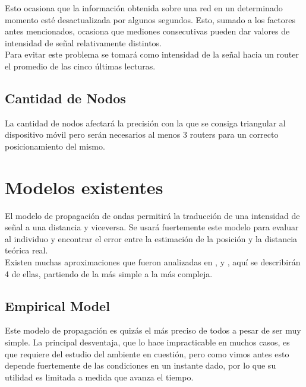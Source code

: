 \documentclass[journal]{IEEEtran}
\begin{document}
Esto ocasiona que la información obtenida sobre una red en un determinado momento esté desactualizada por algunos segundos. Esto, sumado a los factores antes mencionados, ocasiona que mediones consecutivas pueden dar valores de intensidad de señal relativamente distintos.\\

Para evitar este problema se tomará como intensidad de la señal hacia un router el promedio de las cinco últimas lecturas.\\

\subsection{Cantidad de Nodos}

La cantidad de nodos afectará la precisión con la que se consiga triangular al dispositivo móvil pero serán necesarios al menos 3 routers para un correcto posicionamiento del mismo.\\

\section{Modelos existentes}

El modelo de propagación de ondas permitirá la traducción de una intensidad de señal a una distancia y viceversa. Se usará fuertemente este modelo para evaluar al individuo y encontrar el error entre la estimación de la posición y la distancia teórica real.\\

Existen muchas aproximaciones que fueron analizadas en \cite{low:cost:location:determination}, \cite{radar:tracking:system} y \cite{generic:model:signal:propagation}, aquí se describirán 4 de ellas, partiendo de la más simple a la más compleja.\\

\subsection{Empirical Model}

Este modelo de propagación es quizás el más preciso de todos a pesar de ser muy simple. La principal desventaja, que lo hace impracticable en muchos casos, es que requiere del estudio del ambiente en cuestión, pero como vimos antes esto depende fuertemente de las condiciones en un instante dado, por lo que su utilidad es limitada a medida que avanza el tiempo.\\
\end{document}
